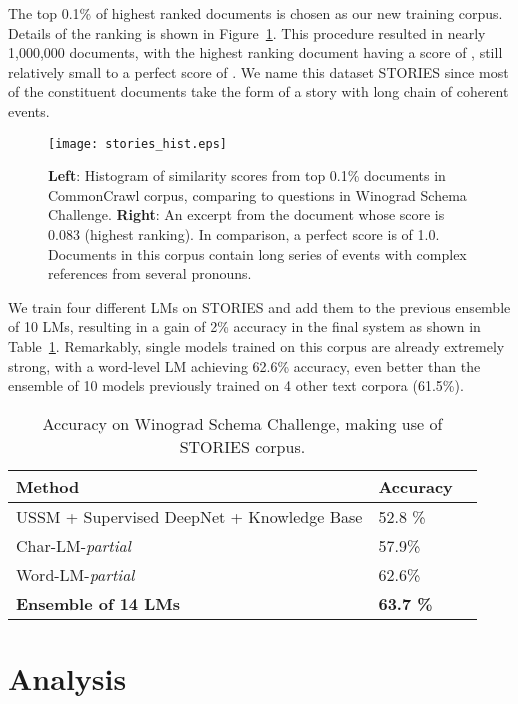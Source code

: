 \documentclass{article}
\begin{document}
The top 0.1\% of highest ranked documents is chosen as our new training corpus. Details of the ranking is shown in Figure~\ref{fig:stories}. This procedure resulted in nearly 1,000,000 documents, with the highest ranking document having a score of , still relatively small to a perfect score of . We name this dataset STORIES since most of the constituent documents take the form of a story with long chain of coherent events.

\begin{figure}[t!]
\centering
\texttt{[image: stories\_hist.eps]}
\caption{\textbf{Left}: Histogram of similarity scores from top 0.1\% documents in CommonCrawl corpus, comparing to questions in Winograd Schema Challenge. \textbf{Right}: An excerpt from the document whose score is 0.083 (highest ranking). In comparison, a perfect score is of 1.0. Documents in this corpus contain long series of events with complex references from several pronouns.}
\label{fig:stories}
\end{figure}

We train four different LMs on STORIES and add them to the previous ensemble of 10 LMs, resulting in a gain of 2\% accuracy in the final system as shown in Table~\ref{tab:winograd_stories}. Remarkably, single models trained on this corpus are already extremely strong, with a word-level LM achieving 62.6\% accuracy, even better than the ensemble of 10 models previously trained on 4 other text corpora (61.5\%).

\begin{table}[h!]
  \caption{Accuracy on Winograd Schema Challenge, making use of STORIES corpus.}
  \label{tab:winograd_stories}
  \centering\small
  \small
  \begin{tabular}{llc}
    \toprule
    Method & Accuracy\\
    \midrule
    USSM + Supervised DeepNet + Knowledge Base & 52.8 \%\\
    \midrule
Char-LM-\emph{partial} & 57.9\%\\
Word-LM-\emph{partial} & 62.6\%\\
    \textbf{Ensemble of 14 LMs} & \textbf{63.7 \%}\\
    \bottomrule
  \end{tabular}
\end{table}

\section{Analysis}
\end{document}
